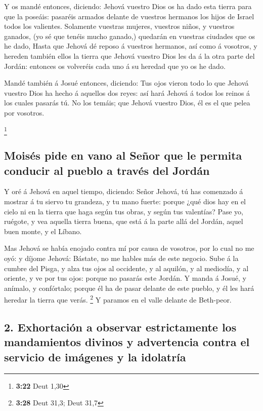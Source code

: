  Y os mandé entonces, diciendo: Jehová vuestro Dios os ha
dado esta tierra para que la poseáis: pasaréis armados delante de
vuestros hermanos los hijos de Israel todos los valientes. 
Solamente vuestras mujeres, vuestros niños, y vuestros ganados, (yo sé
que tenéis mucho ganado,) quedarán en vuestras ciudades que os he dado,
 Hasta que Jehová dé reposo á vuestros hermanos, así como á
vosotros, y hereden también ellos la tierra que Jehová vuestro Dios les
da á la otra parte del Jordán: entonces os volveréis cada uno á su
heredad que yo os he dado.

 Mandé también á Josué entonces, diciendo: Tus ojos vieron
todo lo que Jehová vuestro Dios ha hecho á aquellos dos reyes: así hará
Jehová á todos los reinos á los cuales pasarás tú.  No los
temáis; que Jehová vuestro Dios, él es el que pelea por vosotros.

\footnote{\textbf{3:22} Deut 1,30}

\hypertarget{moisuxe9s-pide-en-vano-al-seuxf1or-que-le-permita-conducir-al-pueblo-a-travuxe9s-del-jorduxe1n}{%
\subsection{Moisés pide en vano al Señor que le permita conducir al
pueblo a través del
Jordán}\label{moisuxe9s-pide-en-vano-al-seuxf1or-que-le-permita-conducir-al-pueblo-a-travuxe9s-del-jorduxe1n}}

 Y oré á Jehová en aquel tiempo, diciendo: 
Señor Jehová, tú has comenzado á mostrar á tu siervo tu grandeza, y tu
mano fuerte: porque ¿qué dios hay en el cielo ni en la tierra que haga
según tus obras, y según tus valentías?  Pase yo, ruégote,
y vea aquella tierra buena, que está á la parte allá del Jordán, aquel
buen monte, y el Líbano.

 Mas Jehová se había enojado contra mí por causa de
vosotros, por lo cual no me oyó: y díjome Jehová: Bástate, no me hables
más de este negocio.  Sube á la cumbre del Pisga, y alza
tus ojos al occidente, y al aquilón, y al mediodía, y al oriente, y ve
por tus ojos: porque no pasarás este Jordán.  Y manda á
Josué, y anímalo, y confórtalo; porque él ha de pasar delante de este
pueblo, y él les hará heredar la tierra que verás. \footnote{\textbf{3:28}
  Deut 31,3; Deut 31,7}  Y paramos en el valle delante de
Beth-peor.

\hypertarget{exhortaciuxf3n-a-observar-estrictamente-los-mandamientos-divinos-y-advertencia-contra-el-servicio-de-imuxe1genes-y-la-idolatruxeda}{%
\subsection{2. Exhortación a observar estrictamente los mandamientos
divinos y advertencia contra el servicio de imágenes y la
idolatría}\label{exhortaciuxf3n-a-observar-estrictamente-los-mandamientos-divinos-y-advertencia-contra-el-servicio-de-imuxe1genes-y-la-idolatruxeda}}

